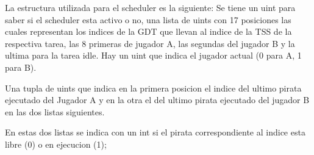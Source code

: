 La estructura utilizada para el scheduler es la siguiente:
  Se tiene un uint para saber si el scheduler esta activo o no, una lista de uints con 17 posiciones las cuales
  representan los indices de la GDT que llevan al indice de la TSS de la respectiva tarea, las 8 primeras de jugador A,
  las segundas del jugador B y la ultima para la tarea idle.
  Hay un uint que indica el jugador actual (0 para A, 1 para B).

Una tupla de uints que indica en la primera posicion el indice del ultimo pirata ejecutado del Jugador A y en la otra el del
ultimo pirata ejecutado del jugador B en las dos listas siguientes.

En estas dos listas se indica con un int si el pirata correspondiente al indice esta libre (0) o en ejecucion (1);
